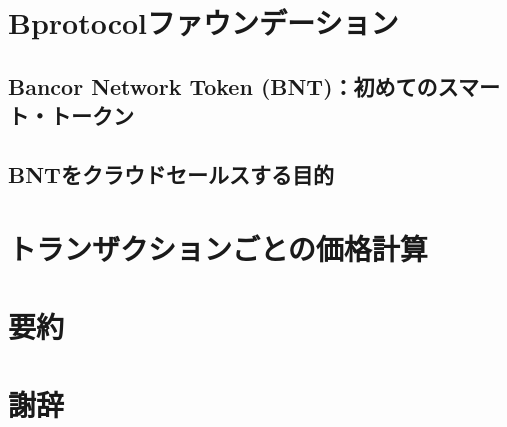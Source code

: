 \documentclass{jsarticle}
\begin{document}
\section{Bprotocolファウンデーション}



\subsection{Bancor Network Token (BNT)：初めてのスマート・トークン}



\subsection{BNTをクラウドセールスする目的}



\section{トランザクションごとの価格計算}



\section{要約}



\section{謝辞}
\end{document}
